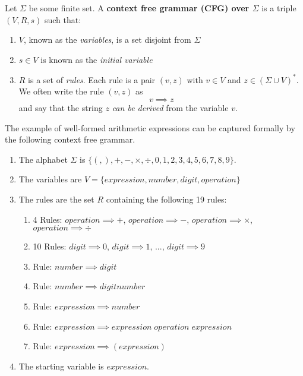   \begin{definition}
  Let $\Sigma$ be some finite set. A \textbf{context free grammar (CFG) over $\Sigma$} is a triple $(V, R, s)$ such that: 
  \begin{enumerate}
      \item $V$, known as the \textit{variables}, is a set disjoint from $\Sigma$
      \item $s \in V$ is known as the \textit{initial variable}
      \item $R$ is a set of \textit{rules}. Each rule is a pair $(v, z)$ with $v \in V$ and $z \in (\Sigma \cup V)^*$. We often write the rule $(v, z)$ as 
      \[v \implies z\]
      and say that the string $z$ \textit{can be derived} from the variable $v$. 
  \end{enumerate}
  \end{definition}

  \begin{example}
  The example of well-formed arithmetic expressions can be captured formally by the following context free grammar. 
  \begin{enumerate}
      \item The alphabet $\Sigma$ is $\{(, ), +, -, \times, \div, 0, 1, 2, 3, 4, 5, 6, 7, 8, 9\}$. 
      \item The variables are $V = \{expression, number, digit, operation\}$
      \item The rules are the set $R$ containing the following 19 rules: 
      \begin{enumerate}
          \item 4 Rules: $operation \implies +$, $operation \implies -$, $operation \implies \times$, $operation \implies \div$
          \item 10 Rules: $digit \implies 0$, $digit \implies 1$, ..., $digit \implies 9$
          \item Rule: $number \implies digit$
          \item Rule: $number \implies digit number$
          \item Rule: $expression \implies number$
          \item Rule: $expression \implies expression\; operation\; expression$
          \item Rule: $expression \implies (expression)$
      \end{enumerate}
      \item The starting variable is $expression$.
  \end{enumerate}
  \end{example}

